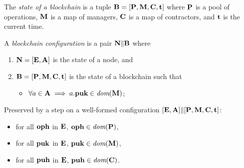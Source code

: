 \documentclass[a4paper]{llncs}
\begin{document}


\begin{definition}%
  The \emph{state of a blockchain} is a tuple
  $\textbf{B} = [\textbf{P}, \textbf{M}, \textbf{C}, \textbf{t}]$ where
  $\textbf{P}$ is a pool of operations, $\textbf{M}$ is a map of managers,
  $\textbf{C}$ is a map of contractors, and $\textbf{t}$ is the current
  time. 
\end{definition}
\begin{definition}%
A \emph{blockchain configuration} is a pair
$ \textbf{N} \| \textbf{B}$ where
\begin{enumerate}
\item $\textbf{N} = [\textbf{E}, \textbf{A}]$ is the state of a node, and
\item $\textbf{B} = [\textbf{P}, \textbf{M}, \textbf{C},
  \textbf{t}]$ is the state of a blockchain  
  such that
  \begin{itemize}
  \item
    $\forall a \in \textbf{A} \implies a.\textbf{puk} \in \textit{dom}( \textbf{M})$;
  \end{itemize}
\end{enumerate}
\end{definition}
\begin{definition}
  Preserved by a step on a well-formed configuration $ [\textbf{E}, \textbf{A}] \|
  [\textbf{P}, \textbf{M}, \textbf{C}, \textbf{t}]$:
  \begin{itemize}
  \item for all $\textbf{oph}$ in $\textbf{E}$, $\textbf{oph} \in \textit{dom} (\textbf{P})$,
  \item for all $\textbf{puk}$ in $\textbf{E}$, $\textbf{puk} \in \textit{dom} (\textbf{M})$,
  \item for all $\textbf{puh}$ in $\textbf{E}$, $\textbf{puh} \in \textit{dom} (\textbf{C})$.
  \end{itemize}
\end{definition}
\end{document}
